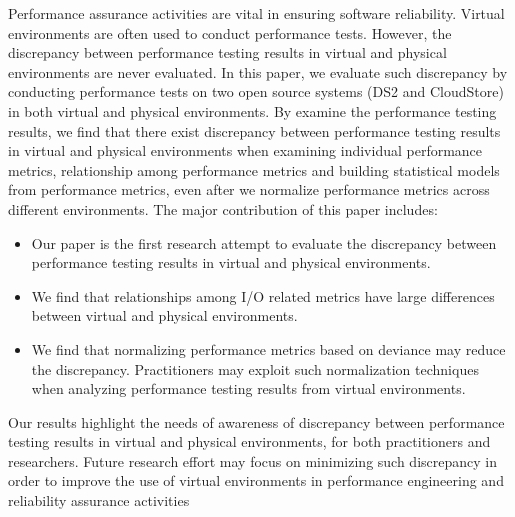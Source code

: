Performance assurance activities are vital in ensuring software reliability. Virtual environments are often used to conduct performance tests. However, the discrepancy between performance testing results in virtual and physical environments are never evaluated. In this paper, we evaluate such discrepancy by conducting performance tests on two open source systems (DS2 and CloudStore) in both virtual and physical environments. By examine the performance testing results, we find that there exist discrepancy between performance testing results in virtual and physical environments when examining individual performance metrics, relationship among performance metrics and building statistical models from performance metrics, even after we normalize performance metrics across different environments. The major contribution of this paper includes: 
\vspace{-0.15cm}
\begin{itemize} \itemsep -0.8pt 
	\item Our paper is the first research attempt to evaluate the discrepancy between performance testing results in virtual and physical environments.
	\item We find that relationships among I/O related metrics have large differences between virtual and physical environments.
	\item We find that normalizing performance metrics based on deviance may reduce the discrepancy. Practitioners may exploit such normalization techniques when analyzing performance testing results from virtual environments.
\end{itemize}
\vspace{-0.15cm}
Our results highlight the needs of awareness of discrepancy between performance testing results in virtual and physical environments, for both practitioners and researchers. Future research effort may focus on minimizing such discrepancy in order to improve the use of virtual environments in performance engineering and reliability assurance activities



